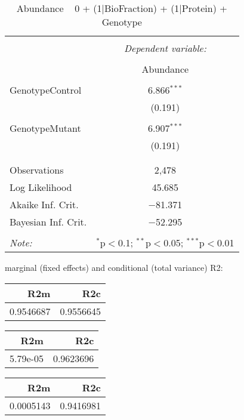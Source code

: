 \documentclass[11pt]{report}
\begin{document}
\begin{table}[!htbp] \centering 
  \caption{Abundance ~ 0 + (1|BioFraction) + (1|Protein) + Genotype} 
  \label{} 
\begin{tabular}{@{\extracolsep{5pt}}lc} 
\\[-1.8ex]\hline 
\hline \\[-1.8ex] 
 & \multicolumn{1}{c}{\textit{Dependent variable:}} \\ 
\cline{2-2} 
\\[-1.8ex] & Abundance \\ 
\hline \\[-1.8ex] 
 GenotypeControl & 6.866$^{***}$ \\ 
  & (0.191) \\ 
  & \\ 
 GenotypeMutant & 6.907$^{***}$ \\ 
  & (0.191) \\ 
  & \\ 
\hline \\[-1.8ex] 
Observations & 2,478 \\ 
Log Likelihood & 45.685 \\ 
Akaike Inf. Crit. & $-$81.371 \\ 
Bayesian Inf. Crit. & $-$52.295 \\ 
\hline 
\hline \\[-1.8ex] 
\textit{Note:}  & \multicolumn{1}{r}{$^{*}$p$<$0.1; $^{**}$p$<$0.05; $^{***}$p$<$0.01} \\ 
\end{tabular} 
\end{table} 
marginal (fixed effects) and conditional (total variance) R2:

\begin{tabular}{r|r}
\hline
R2m & R2c\\
\hline
0.9546687 & 0.9556645\\
\hline
\end{tabular}

\begin{tabular}{r|r}
\hline
R2m & R2c\\
\hline
5.79e-05 & 0.9623696\\
\hline
\end{tabular}

\begin{tabular}{r|r}
\hline
R2m & R2c\\
\hline
0.0005143 & 0.9416981\\
\hline
\end{tabular}
\end{document}
